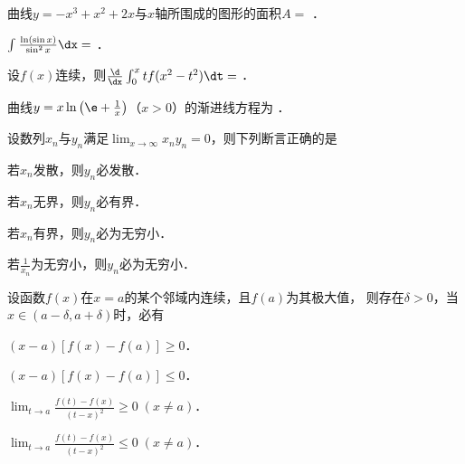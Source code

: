 \documentclass[plain,noanswer,medmath]{../../template/jnuexam}
\begin{document}








\begin{problem}
曲线$y = - x^3 + x^2 + 2x$与$x$轴所围成的图形的面积$A =$ \fillin{}．
\end{problem}


\begin{problem}
$\int_{}^{} \frac{\ln(\sin x)}{\sin^2 x}\dx =$ \fillin{}．
\end{problem}


\begin{problem}
设$f(x)$连续，则$\frac{\d}{\dx}\int_0^x tf(x^2 - t^2)\dt =$ \fillin{}．
\end{problem}


\begin{problem}
曲线$y = x\ln \left(\e + \frac{1}{x} \right)$（$x > 0$）的渐进线方程为 \fillin{}．
\end{problem}




\begin{problem}
设数列$x_n$与$y_n$满足$\lim_{x \to \infty} x_n y_n = 0$，则下列断言正确的是\pickout{}
\begin{abcd}
\item 若$x_n$发散，则$y_n$必发散．
\item 若$x_n$无界，则$y_n$必有界．
\item 若$x_n$有界，则$y_n$必为无穷小．
\item 若$\frac{1}{x_n}$为无穷小，则$y_n$必为无穷小．
\end{abcd}
\end{problem}






\begin{problem}
设函数$f(x)$在$x = a$的某个邻域内连续，且$f(a)$为其极大值，
则存在$\delta > 0$，当$x \in \left(a - \delta ,a + \delta \right)$时，必有\pickout{}
\begin{abcd}
\item $(x - a)[f(x) - f(a)] \ge 0$．
\item $(x - a)[f(x) - f(a)] \le 0$．
\item $\lim_{t \to a} \frac{f(t) - f(x)}{(t - x)^2} \ge 0\;\left(x \ne a \right)$．
\item $\lim_{t \to a} \frac{f(t) - f(x)}{(t - x)^2} \le 0\;\left(x \ne a \right)$．
\end{abcd}
\end{problem}
\end{document}
